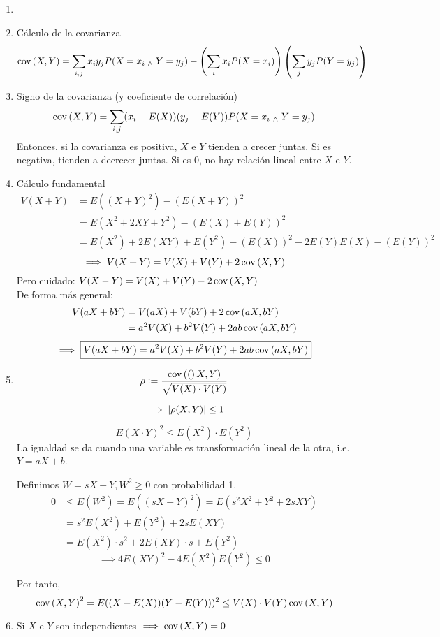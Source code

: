 \begin{obs}
	\begin{enumerate}
		\item[]
		\item Cálculo de la covarianza
		\[\operatorname{cov}\left(X, Y\right) = \sum_{i,j}x_iy_jP(X=x_i \; _{\wedge} \; Y=y_j) - \left(\sum_{i} x_iP(X=x_i)\right)\left(\sum_{j} y_jP(Y=y_j)\right)\]
		\item Signo de la covarianza (y coeficiente de correlación)
		\[\operatorname{cov}\left(X, Y\right) = \sum_{i,j}(x_i-E(X))(y_j-E(Y))P(X=x_i \; _{\wedge} \; Y=y_j)\]
		Entonces, si la covarianza es positiva, $X$ e $Y$ tienden a crecer juntas. Si es negativa, tienden a decrecer juntas. Si es 0, no hay relación lineal entre $X$ e $Y$.
		\item Cálculo fundamental
		\begin{align*}
			V(X+ Y) &= E((X+Y)^2)- (E(X+Y))^2 \\
			&= E(X^2+2XY+Y^2)- (E(X)+E(Y))^2 \\
			&= E(X^2)+2E(XY)+E(Y^2)- (E(X))^2-2E(Y)E(X) - (E(Y))^2
		\end{align*}
		\[\implies V(X+ Y) = V(X) + V(Y) + 2\operatorname{cov}\left(X, Y\right)\]
		Pero cuidado: $V(X-Y)=V(X) + V(Y) -2\operatorname{cov}\left(X, Y\right)$ \\
		De forma más general:
		\begin{align*}
			V(aX+ bY) &= V(aX) + V(bY) + 2\operatorname{cov}\left(aX, bY\right) \\
			&= a^2V(X) + b^2V(Y) + 2ab\operatorname{cov}\left(aX, bY\right)
		\end{align*}
		\[\implies \boxed{V(aX+ bY)=a^2V(X) + b^2V(Y) + 2ab\operatorname{cov}\left(aX, bY\right)}\]
		\item \begin{defn}
			\[\rho\vcentcolon= \frac{\operatorname{cov}\left((\right)X, Y)}{\sqrt{V(X)\cdot V(Y)}}\]
		\end{defn}
		\[\implies \left|\rho(X, Y)\right| \leq 1\]
		\begin{prop}
			\[E(X\cdot Y)^2 \leq E(X^2)\cdot E(Y^2)\]
			La igualdad se da cuando una variable es transformación lineal de la otra, i.e. $Y=aX+b$.
			\begin{dem}
				Definimos $W=sX+Y, W^2\geq 0$ con probabilidad 1.
				\begin{align*}
					0  &\leq E(W^2)=E((sX+Y)^2)=E(s^2X^2+Y^2+2sXY) \\
					&= s^2E(X^2)+E(Y^2)+2sE(XY) \\
					&= E(X^2)\cdot s^2+2E(XY)\cdot s+E(Y^2) 
				\end{align*}
				\[\implies 4E(XY)^2-4E(X^2)E(Y^2)\leq 0\]
			\end{dem}
		\end{prop}
		Por tanto,
		\[\operatorname{cov}\left(X, Y\right)^2 = E((X-E(X))(Y-E(Y)))^2 \leq V(X)\cdot V(Y)\operatorname{cov}\left(X, Y\right)\]
		\item Si $X$ e $Y$ son independientes $\implies \operatorname{cov}\left(X, Y\right)=0$
	\end{enumerate}
\end{obs}